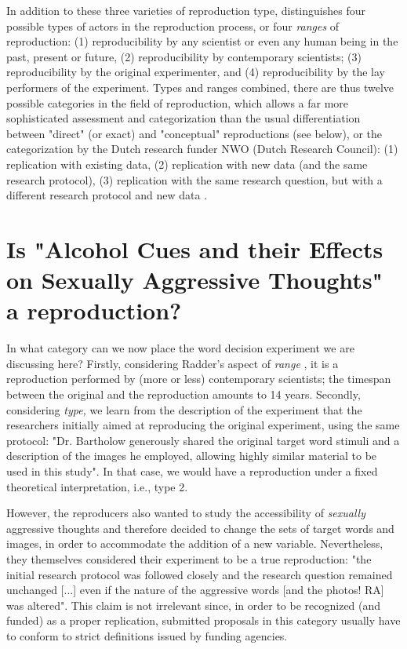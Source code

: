 \documentclass[twocolumn, serif, authordate, reflection]{jote-article}
\begin{document}
In addition to these three varieties of reproduction type, \textcite{Radder1996} distinguishes four possible types of actors in the reproduction process, or four \textit{ranges }of reproduction: (1) reproducibility by any scientist or even any human being in the past, present or future, (2) reproducibility by contemporary scientists; (3) reproducibility by the original experimenter, and (4) reproducibility by the lay performers of the experiment. Types and ranges combined, there are thus twelve possible categories in the field of reproduction, which allows a far more sophisticated assessment and categorization than the usual differentiation between "direct" (or exact) and "conceptual" reproductions (see below), or the categorization by the Dutch research funder NWO (Dutch Research Council): (1) replication with existing data, (2) replication with new data (and the same research protocol), (3) replication with the same research question, but with a different research protocol and new data \parencite{NWO2019}.


{}
\section*{Is "Alcohol Cues and their Effects on Sexually Aggressive Thoughts" a reproduction?}



In what category can we now place the word decision experiment we are discussing here? Firstly, considering Radder’s aspect of \textit{range }\parencite{Radder1996}, it is a reproduction performed by (more or less) contemporary scientists; the timespan between the original and the reproduction amounts to 14 years. Secondly, considering \textit{type, }we learn from the description of the experiment that the researchers initially aimed at reproducing the original experiment, using the same protocol: "Dr. Bartholow generously shared the original target word stimuli and a description of the images he employed, allowing highly similar material to be used in this study"\parencite[p. 15]{Leboeuf2020}. In that case, we would have a reproduction under a fixed theoretical interpretation, i.e., type 2.
 
However, the reproducers also wanted to study the accessibility of \textit{sexually }aggressive thoughts and therefore decided to change the sets of target words and images, in order to accommodate the addition of a new variable. Nevertheless, they themselves considered their experiment to be a true reproduction: "the initial research protocol was followed closely and the research question remained unchanged [...] even if the nature of the aggressive words [and the photos! RA] was altered"\parencite[p. 16]{Leboeuf2020}. This claim is not irrelevant since, in order to be recognized (and funded) as a proper replication, submitted proposals in this category usually have to conform to strict definitions issued by funding agencies. 
 
\end{document}
